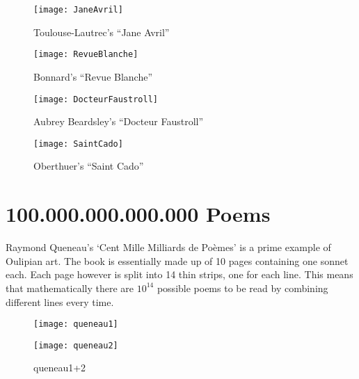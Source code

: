 \begin{figure}
\centering
\begin{minipage}{.45\linewidth}
  \texttt{[image: JaneAvril]}
  \caption[Toulouse-Lautrec's ``Jane Avril'']{Toulouse-Lautrec's ``Jane Avril''}
\label{fig:toulouse}
\end{minipage}
\hspace{.05\linewidth}
\begin{minipage}{.45\linewidth}
  \texttt{[image: RevueBlanche]}
  \caption[Bonnard's ``Revue Blanche'']{Bonnard's ``Revue Blanche''}
\label{fig:bonnard}
\end{minipage}
\vspace{.05\linewidth}
\begin{minipage}{.45\linewidth}
  \texttt{[image: DocteurFaustroll]}
  \caption[Aubrey Beardsley's ``Docteur Faustroll'']{Aubrey Beardsley's ``Docteur Faustroll''}
\label{fig:beardsley}
\end{minipage}
\hspace{.05\linewidth}
\begin{minipage}{.45\linewidth}
  \texttt{[image: SaintCado]}
  \caption[Oberthuer's ``Saint Cado'']{Oberthuer's ``Saint Cado''}
\label{fig:oberthuer}
\end{minipage}
\end{figure}


\section{100.000.000.000.000 Poems}

Raymond Queneau's `Cent Mille Milliards de Poèmes' is a prime example of Oulipian art. The book is essentially made up of 10 pages containing one sonnet each. Each page however is split into 14 thin strips, one for each line. This means that mathematically there are $10^{14}$ possible poems to be read by combining different lines every time.

\begin{figure}[h!]
\centering
\begin{minipage}{.45\linewidth}
  \texttt{[image: queneau1]}
\end{minipage}
\hspace{.05\linewidth}
\begin{minipage}{.45\linewidth}
  \texttt{[image: queneau2]}
\end{minipage}
\caption[queneau1+2]{queneau1+2\footnotemark}
\label{fig:queneau12}
\end{figure}


